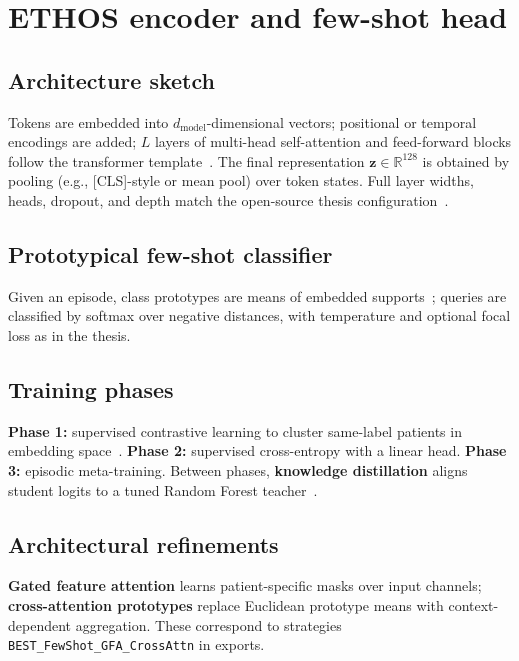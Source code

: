\section{ETHOS encoder and few-shot head}
\label{sec:ethos}

\subsection{Architecture sketch}
Tokens are embedded into $d_{\mathrm{model}}$-dimensional vectors; positional or temporal encodings are added; $L$ layers of multi-head self-attention and feed-forward blocks follow the transformer template~\citep{vaswani2017attention}. The final representation $\mathbf{z} \in \mathbb{R}^{128}$ is obtained by pooling (e.g., [CLS]-style or mean pool) over token states. Full layer widths, heads, dropout, and depth match the open-source thesis configuration~\citep{sharafi2023ethos}.

\subsection{Prototypical few-shot classifier}
Given an episode, class prototypes are means of embedded supports~\citep{snell2017prototypical}; queries are classified by softmax over negative distances, with temperature and optional focal loss as in the thesis.

\subsection{Training phases}
\textbf{Phase 1:} supervised contrastive learning to cluster same-label patients in embedding space~\citep{khosla2020supervised}. \textbf{Phase 2:} supervised cross-entropy with a linear head. \textbf{Phase 3:} episodic meta-training. Between phases, \textbf{knowledge distillation} aligns student logits to a tuned Random Forest teacher~\citep{hinton2015distilling}.

\subsection{Architectural refinements}
\textbf{Gated feature attention} learns patient-specific masks over input channels; \textbf{cross-attention prototypes} replace Euclidean prototype means with context-dependent aggregation. These correspond to strategies \texttt{BEST\_FewShot\_GFA\_CrossAttn} in exports.
